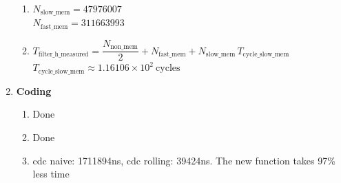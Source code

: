 \documentclass[12pt]{article}
\begin{document}
\begin{enumerate}
\begin{enumerate}[label=\arabic*)]
        \item $N_{\text{slow\_mem}} = 47976007$ \\
                $N_{\text{fast\_mem}} = 311663993$
        \item \noindent $T_{\text{filter\_h\_measured}}=\dfrac{N_{\text{non\_mem}}}{2}+N_{\text{fast\_mem}}+N_{\text{slow\_mem}}\,T_{\text{cycle\_slow\_mem}}$\\
\noindent $T_{\text{cycle\_slow\_mem}}\approx 1.16106\times10^{2}\ \text{cycles}$

    \end{enumerate}

    \item \textbf{Coding}
    \begin{enumerate}[label=\arabic*)]
        \item Done
        \item Done
        \item cdc naive: 1711894ns, cdc rolling: 39424ns. The new function takes 97\% less time

    \end{enumerate}

\end{enumerate}
\end{document}
